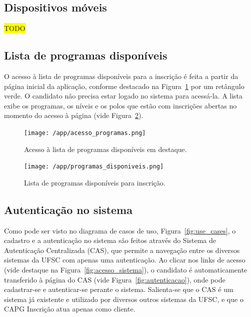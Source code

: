 \documentclass[
  10.5pt,				  %
	openright,			%
	twoside,			  %
  a5paper,
  chapter=TITLE,	%
	section=TITLE,	%
  hyphens,        %
	english,        %
	brazil          %
]{abntex2}
\begin{document}
\subsection{Dispositivos móveis}\label{sec:mobile}

\colorbox{yellow}{TODO}




\subsection{Lista de programas disponíveis}\label{sec:programas_disponiveis}
O acesso à lista de programas disponíveis para a inscrição é feita a partir da página inicial da aplicação, conforme destacado na Figura~\ref{fig:acesso_programas} por um retângulo verde. O candidato não precisa estar logado no sistema para acessá-la. A lista exibe os programas, os níveis e os polos que estão com inscrições abertas no momento do acesso à página (vide Figura~\ref{fig:programas_disponiveis}).

\begin{figure}[!ht]
  \caption{\label{fig:acesso_programas} Acesso à lista de programas disponíveis em destaque. }
  \begin{center}
    \texttt{[image: /app/acesso\_programas.png]}
  \end{center}
\end{figure}



\begin{figure}[!ht]
  \caption{\label{fig:programas_disponiveis} Lista de programas disponíveis para inscrição. }
  \begin{center}
    \texttt{[image: /app/programas\_disponiveis.png]}
  \end{center}
\end{figure}




\subsection{Autenticação no sistema}\label{sec:autenticacao}
Como pode ser visto no diagrama de casos de uso, Figura~\ref{fig:use_cases}, o cadastro e a autenticação no sistema são feitos através do Sistema de Autenticação Centralizada (CAS), que permite a navegação entre os diversos sistemas da UFSC com apenas uma autenticação. Ao clicar nos links de acesso (vide destaque na Figura~\ref{fig:acesso_sistema}), o candidato é automaticamente transferido à página do CAS (vide Figura~\ref{fig:autenticacao}), onde pode cadastrar-se e autenticar-se perante o sistema. Salienta-se que o CAS é um sistema já existente e utilizado por diversos outros sistemas da UFSC, e que o CAPG Inscrição atua apenas como cliente.
\end{document}
